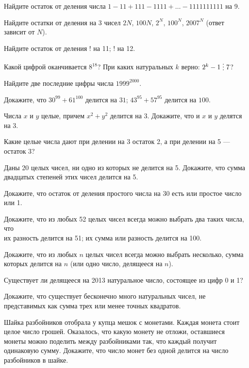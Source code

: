 \documentclass[a4paper,12pt]{article}
\newcommand{\del}{\mathrel{\raisebox{-.3 ex}{${\vdots}$}}}
\begin{document}
Найдите остаток от деления числа  $1-11+111-1111+\ldots-1111111111$ на 9.

Найдите остатки от деления на 3 чисел $2N$, $100N$, $2^N$, $100^N$, $2007^N$ (ответ зависит от $N$).

Найдите остаток от деления  ! на 11; ! на 12.

Какой цифрой оканчивается %
$8^{18}$?
При каких натуральных $k$ верно: $2^k-1\del7$?

Найдите две последние цифры числа $1999^{2000}$.


Докажите, что
 $30^{99}+61^{100}$ делится на $31$;
 $43^{95}+57^{95}$ делится на $100$.



Числа $x$ и $y$ целые, причем $x^2+y^2$ делится на 3.
Докажите, что и $x$ и $y$ делятся на 3.

Какие целые числа дают при делении на 3 остаток 2,
а при делении на 5 --- остаток 3?

Даны 20 целых чисел, ни одно из которых не делится на 5. Докажите, что
сумма двадцатых степеней этих чисел делится на 5.

Докажите, что остаток от деления простого  числа на 30 есть или простое
число или 1.

Докажите, что из любых 52 целых чисел всегда можно выбрать два
таких числа, что\\
их разность делится на 51;
их сумма или разность делится на 100.

Докажите, что из любых $n$ целых чисел всегда можно выбрать несколько,
сумма которых делится на $n$ (или одно число, делящееся на $n$).

Существует ли делящееся на 2013 натуральное число,
состоящее из цифр 0 и 1?

Докажите, что существует бесконечно много натуральных чисел, не представимых как сумма трех или менее точных квадратов.

Шайка разбойников отобрала у купца мешок с монетами. Каждая монета стоит целое число грошей. Оказалось, что какую монету не отложи, оставшиеся монеты можно поделить между разбойниками так, что каждый получит одинаковую сумму. Докажите, что число монет без одной делится на число разбойников в шайке.
\end{document}

